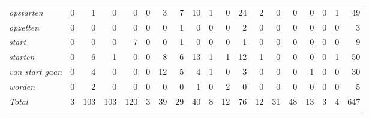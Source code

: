 \begin{table}
{\begin{tabular}{>{\itshape}lrrrrrrrrrrrrrrrrrr}
opstarten &  0 &  1 &  0 &  0 &  0 &  3 &  7 &  10 &  1 &  0 &  24 &  2 &  0 &  0 &  0 &  0 &  1 &  49\\
opzetten &  0 &  0 &  0 &  0 &  0 &  0 &  1 &  0 &  0 &  0 &  2 &  0 &  0 &  0 &  0 &  0 &  0 &  3\\
start &  0 &  0 &  0 &  7 &  0 &  0 &  1 &  0 &  0 &  0 &  1 &  0 &  0 &  0 &  0 &  0 &  0 &  9\\
starten &  0 &  6 &  1 &  0 &  0 &  8 &  6 &  13 &  1 &  1 &  12 &  1 &  0 &  0 &  0 &  0 &  1 &  50\\
van start gaan &  0 &  4 &  0 &  0 &  0 &  12 &  5 &  4 &  1 &  0 &  3 &  0 &  0 &  0 &  1 &  0 &  0 &  30\\
worden &  0 &  2 &  0 &  0 &  0 &  0 &  0 &  1 &  0 &  2 &  0 &  0 &  0 &  0 &  0 &  0 &  0 &  5\\
\midrule
\normalfont Total  & 3 &  103 &  103 &  120 &  3 &  39 &  29 &  40 &  8 &  12 &  76 &  12 &  31 &  48 &  13 &  3 &  4 &  647\\
\lspbottomrule
\end{tabular}}
\end{table} 

